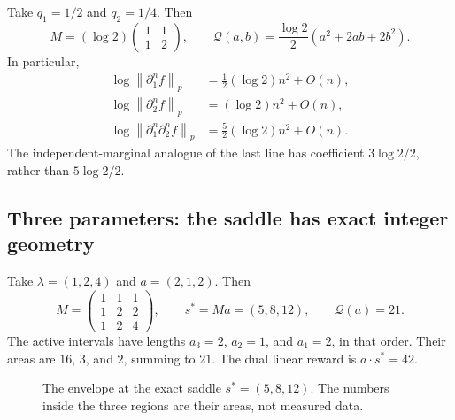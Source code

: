 \documentclass[11pt,a4paper]{article}
\numberwithin{equation}{section}
\theoremstyle{definition}
\theoremstyle{remark}\newtheorem{remark}[theorem]{Remark}
\newcommand{\Qf}{\mathcal Q}
\newcommand{\norm}[1]{\left\lVert #1\right\rVert}
\begin{document}
Take $q_1=1/2$ and $q_2=1/4$. Then
\begin{equation}
 M=(\log2)\begin{pmatrix}1&1\\1&2\end{pmatrix},\qquad
 \Qf(a,b)=\frac{\log2}{2}(a^2+2ab+2b^2).
 \label{eq:dyadic2}
\end{equation}
In particular,
\begin{align*}
 \log\norm{\partial_1^nf}_p&=\tfrac12(\log2)n^2+O(n),\\
 \log\norm{\partial_2^nf}_p&=(\log2)n^2+O(n),\\
 \log\norm{\partial_1^n\partial_2^nf}_p&=\tfrac52(\log2)n^2+O(n).
\end{align*}
The independent-marginal analogue of the last line has coefficient
$3\log2/2$, rather than $5\log2/2$.

\subsection{Three parameters: the saddle has exact integer geometry}

Take $\lambda=(1,2,4)$ and $a=(2,1,2)$. Then
\begin{equation}
 M=\begin{pmatrix}1&1&1\\1&2&2\\1&2&4\end{pmatrix},\qquad
 s^*=Ma=(5,8,12),\qquad \Qf(a)=21.
 \label{eq:threeexample}
\end{equation}
The active intervals have lengths $a_3=2$, $a_2=1$, and $a_1=2$, in that
order. Their areas are $16$, $3$, and $2$, summing to $21$.
The dual linear reward is $a\cdot s^*=42$.

\begin{figure}[htbp]
\centering
{}
\caption{The envelope at the exact saddle $s^*=(5,8,12)$.
The numbers inside the three regions are their areas, not measured data.}
\label{fig:envelope}
\end{figure}
\end{document}
